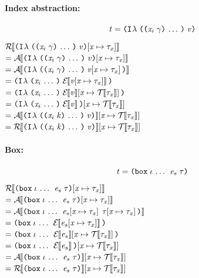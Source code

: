 \begin{sproof}
  \paragraph{Index abstraction:}
  \[\term = \ilam{\sequence{\notevar{\var_i}{\sort}}}{\val}\]
  $\EraseTrm{\typesubst{\ilam{\sequence{\notevar{\var_i}{\sort}}}{\val}}}$ \\
  $= \EraseA{\typesubst{\ilam{\sequence{\notevar{\var_i}{\sort}}}{\val}}}$ \\
  $= \EraseA{\ilam{\sequence{\notevar{\var_i}{\sort}}}{\typesubst{\val}}}$ \\
  $= \ilam{\sequence{\var_i}}{\EraseE{\typesubst{\val}}}$ \\
  $= \ilam{\sequence{\var_i}}{\etypesubst{\EraseE{\val}}}$ \\
  $= \etypesubst{\ilam{\sequence{\var_i}}{\EraseE{\val}}}$ \\
  $= \etypesubst{\EraseA{\ilam{\sequence{\notevar{\var_i}{\kind}}}{\val}}}$ \\
  $= \etypesubst{\EraseTrm{\ilam{\sequence{\notevar{\var_i}{\kind}}}{\val}}}$ \\

  \paragraph{Box:}
  \[\term = \dsum{\sequence{\idx}}{\expr_s}{\type}\]
  $\EraseTrm{\typesubst{\dsum{\sequence{\idx}}{\expr_s}{\type}}}$ \\
  $= \EraseA{\typesubst{\dsum{\sequence{\idx}}{\expr_s}{\type}}}$ \\
  $= \EraseA{{\dsum{\sequence{\idx}}{\typesubst{\expr_s}}{\typesubst{\type}}}}$ \\
  $= \dsum{\sequence{\idx}}{\EraseE{\typesubst{\expr_s}}}{}$ \\
  $= \dsum{\sequence{\idx}}{\etypesubst{\EraseE{\expr_s}}}{}$ \\
  $= \etypesubst{\dsum{\sequence{\idx}}{\EraseE{\expr_s}}{}}$ \\
  $= \etypesubst{\EraseA{\dsum{\sequence{\idx}}{\expr_s}{\type}}}$ \\
  $= \etypesubst{\EraseTrm{\dsum{\sequence{\idx}}{\expr_s}{\type}}}$ \\


\end{sproof}
